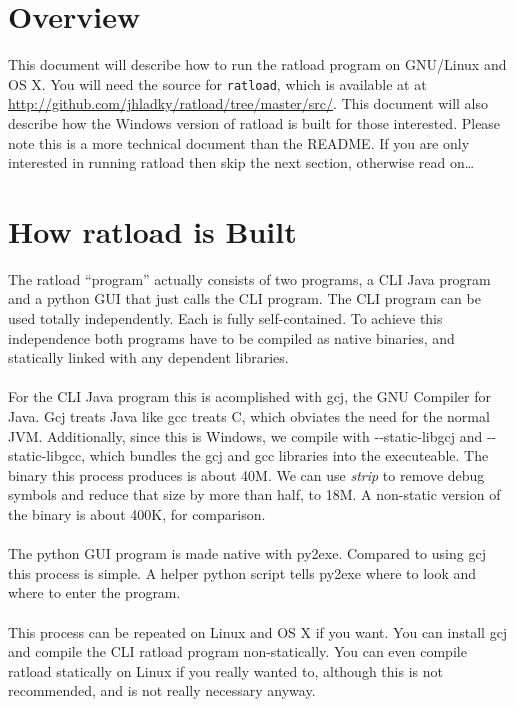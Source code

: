 \documentclass[notitlepage]{article}
\begin{document}
\section{Overview}
This document will describe how to run the ratload program on GNU/Linux and OS X. You will need the source for \texttt{ratload}, which is available at at \url{http://github.com/jhladky/ratload/tree/master/src/}. This document will also describe how the Windows version of ratload is built for those interested. Please note this is a more technical document than the README. If you are only interested in running ratload then skip the next section, otherwise read on\ldots

\section{How ratload is Built}
The ratload ``program'' actually consists of two programs, a CLI Java program and a python GUI that just calls the CLI program. The CLI program can be used totally independently. Each is fully self-contained. To achieve this independence both programs have to be compiled as native binaries, and statically linked with any dependent libraries.\\\\
For the CLI Java program this is acomplished with gcj, the GNU Compiler for Java. Gcj treats Java like gcc treats C, which obviates the need for the normal JVM. Additionally, since this is Windows, we compile with -{-}static-libgcj and -{-}static-libgcc, which bundles the gcj and gcc libraries into the executeable. The binary this process produces is about 40M. We can use \emph{strip} to remove debug symbols and reduce that size by more than half, to 18M. A non-static version of the binary is about 400K, for comparison.\\\\
The python GUI program is made native with py2exe. Compared to using gcj this process is simple. A helper python script tells py2exe where to look and where to enter the program.\\\\
This process can be repeated on Linux and OS X if you want. You can install gcj and compile the CLI ratload program non-statically. You can even compile ratload statically on Linux if you really wanted to, although this is not recommended, and is not really necessary anyway.
\end{document}
